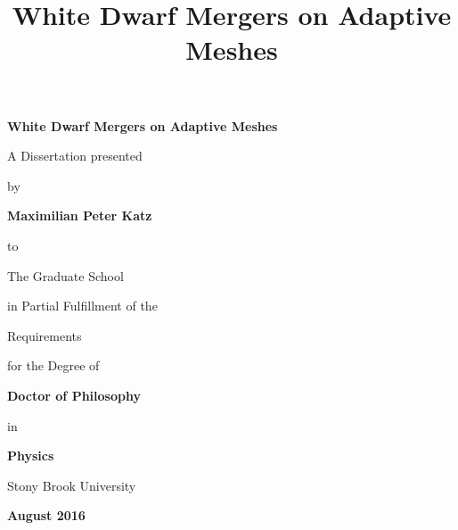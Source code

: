 \documentclass[12pt]{article}
\begin{document}
\newcommand\grl{\ref@jnl{Geophys.~Res.~Lett.}}%
\newcommand\jcp{\ref@jnl{J.~Chem.~Phys.}}%
\newcommand\jgr{\ref@jnl{J.~Geophys.~Res.}}%
\newcommand\jqsrt{\ref@jnl{J.~Quant.~Spec.~Radiat.~Transf.}}%
\newcommand\memsai{\ref@jnl{Mem.~Soc.~Astron.~Italiana}}%
\newcommand\nphysa{\ref@jnl{Nucl.~Phys.~A}}%
\newcommand\physrep{\ref@jnl{Phys.~Rep.}}%
\newcommand\physscr{\ref@jnl{Phys.~Scr}}%
\newcommand\planss{\ref@jnl{Planet.~Space~Sci.}}%
\newcommand\procspie{\ref@jnl{Proc.~SPIE}}%
\newcommand\actaa{\ref@jnl{Acta Astron.}}%
\newcommand\caa{\ref@jnl{Chinese Astron. Astrophys.}}%
\newcommand\cjaa{\ref@jnl{Chinese J. Astron. Astrophys.}}%
\newcommand\jcap{\ref@jnl{J. Cosmology Astropart. Phys.}}%
\newcommand\na{\ref@jnl{New A}}%
\newcommand\nar{\ref@jnl{New A Rev.}}%
\newcommand\pasa{\ref@jnl{PASA}}%
\newcommand\rmxaa{\ref@jnl{Rev. Mexicana Astron. Astrofis.}}%

\title{\bf{White Dwarf Mergers on Adaptive Meshes}}

\vspace*{3\baselineskip}
\centerline{\bf{White Dwarf Mergers on Adaptive Meshes}}
\vspace*{1\baselineskip}
\centerline{A Dissertation presented}
\vspace*{1\baselineskip}
\centerline{by} 
\vspace*{1\baselineskip}
\centerline{\bf{Maximilian Peter Katz}}
\vspace*{1\baselineskip}
\centerline{to} 
\vspace*{1\baselineskip}
\centerline{The Graduate School}
\vspace*{1\baselineskip}
\centerline{in Partial Fulfillment of the}
\vspace*{1\baselineskip}
\centerline{Requirements}
\vspace*{1\baselineskip}
\centerline{for the Degree of}
\vspace*{1\baselineskip}
\centerline{\bf{Doctor of Philosophy}}
\vspace*{1\baselineskip}
\centerline{in}
\vspace*{1\baselineskip}
\centerline{\bf{Physics}}
\vspace*{2\baselineskip}
\centerline{Stony Brook University}
\vspace*{2\baselineskip}
\centerline{\bf{August 2016}}     
\end{document}
